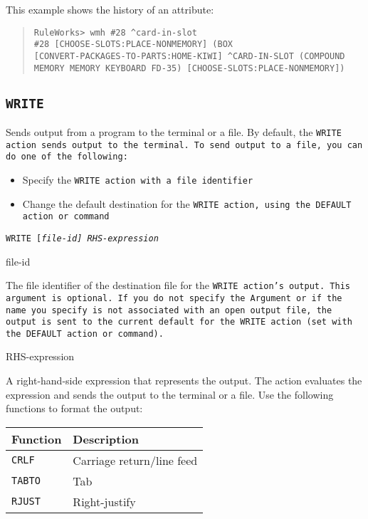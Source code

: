 {{This example shows the history of an attribute:

\begin{quote}
\begin{verbatim}
RuleWorks> wmh #28 ^card-in-slot
#28 [CHOOSE-SLOTS:PLACE-NONMEMORY] (BOX
[CONVERT-PACKAGES-TO-PARTS:HOME-KIWI] ^CARD-IN-SLOT (COMPOUND
MEMORY MEMORY KEYBOARD FD-35) [CHOOSE-SLOTS:PLACE-NONMEMORY])
\end{verbatim}
\end{quote}

\subsection{\tt{WRITE}}

Sends output from a program to the terminal or a file. By
default, the \tt{WRITE} action sends output to the terminal. To
send output to a file, you can do one of the following:

\begin{itemize}
\item Specify the \tt{WRITE} action with a file identifier
\item Change the default destination for the \tt{WRITE} action, using
  the \tt{DEFAULT} action or command
\end{itemize}

\Format

\tt{WRITE} [\it{file-id}] \it{RHS-expression}

\begin{arguments}

\item[file-id]

  The file identifier of the destination file for the \tt{WRITE}
  action's output. This argument is optional. If you do not specify
  the Argument or if the name you specify is not associated with an
  open output file, the output is sent to the current default for the
  \tt{WRITE} action (set with the \tt{DEFAULT} action or command).

\item[RHS-expression]

  A right-hand-side expression that represents the output. The action
  evaluates the expression and sends the output to the terminal or a
  file. Use the following functions to format the output:

\begin{center}
  \begin{tabular}{ll}
    \toprule
    Function & Description \\
    \midrule
    \tt{CRLF} & Carriage return/line feed \\
    \tt{TABTO} & Tab \\
    \tt{RJUST} & Right-justify \\
    \bottomrule
  \end{tabular}
\end{center}


\end{arguments}}}
